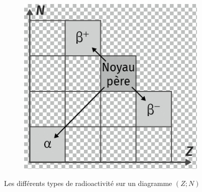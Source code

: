 \documentclass[11pt,a4paper]{article}
\begin{document}
\begin{figure}[H]
\begin{subfigure}{.26\textwidth}
\end{subfigure}
\begin{subfigure}{.17\textwidth}
  \centering
  \includegraphics[width=.95\linewidth]{imgs/p8/desintegrations.jpg}  
\end{subfigure}
\caption{Les différents types de radioactivité sur un diagramme $(Z;N)$}
\end{figure}
\end{document}
